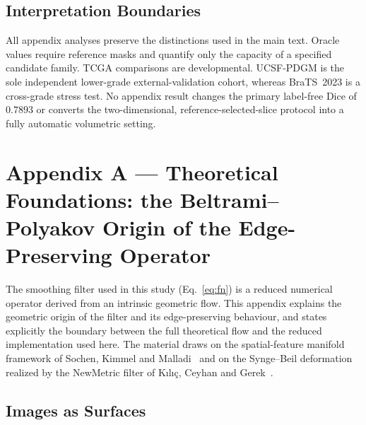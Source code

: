 \documentclass[11pt,a4paper]{article}
\begin{document}
\subsection{Interpretation Boundaries}

All appendix analyses preserve the distinctions used in the main text. Oracle
values require reference masks and quantify only the capacity of a specified
candidate family. TCGA comparisons are developmental. UCSF-PDGM is the sole
independent lower-grade external-validation cohort, whereas BraTS~2023 is a
cross-grade stress test. No appendix result changes the primary label-free Dice
of $0.7893$ or converts the two-dimensional, reference-selected-slice protocol
into a fully automatic volumetric setting.

\clearpage

\iffalse %

\section{Appendix A --- Theoretical Foundations: the Beltrami--Polyakov Origin of the Edge-Preserving Operator}\label{sec:theory}

The smoothing filter used in this study (Eq.~\ref{eq:fn}) is a reduced numerical
operator derived from an intrinsic geometric flow. This appendix explains the
geometric origin of the filter and its edge-preserving behaviour, and states
explicitly the boundary between the full theoretical flow and the reduced
implementation used here. The material draws on the spatial-feature manifold
framework of Sochen, Kimmel and Malladi~\cite{sochen1998} and on the Synge--Beil
deformation realized by the NewMetric filter of Kılıç, Ceyhan and
Gerek~\cite{kilic2022}.

\subsection{Images as Surfaces}\label{sec:theory-embedding}
\end{document}
